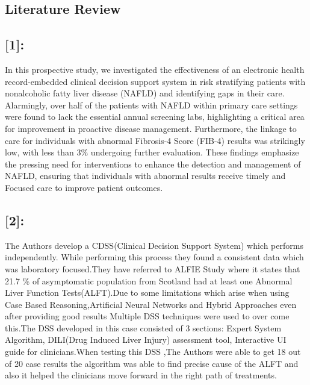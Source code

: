 \documentclass{article}
\begin{document}
\begin{multicols}{2}
\section{Literature Review}
\vspace{5pt}
\subsection{[1]:}
    In this prospective study, we investigated the effectiveness of an electronic health record-embedded clinical decision support system in risk stratifying patients with nonalcoholic fatty liver disease (NAFLD) and identifying gaps in their care. Alarmingly, over half of the patients with NAFLD within primary care settings were found to lack the essential annual screening labs, highlighting a critical area for improvement in proactive disease management. Furthermore, the linkage to care for individuals with abnormal Fibrosis-4 Score (FIB-4) results was strikingly low, with less than 3\% undergoing further evaluation. These findings emphasize the pressing need for interventions to enhance the detection and management of NAFLD, ensuring that individuals with abnormal results receive timely and Focused care to improve patient outcomes.
\vspace{5pt}
\subsection{[2]:}
    The Authors develop a CDSS(Clinical Decision Support System) which performs independently. While performing this process they found a consistent data which was laboratory focused.They have referred to ALFIE Study where it states that 21.7 \% of asymptomatic population from Scotland had at least one Abnormal Liver Function Tests(ALFT).Due to some limitations which arise when using Case Based Reasoning,Artificial Neural Networks and Hybrid Approaches even after providing good results Multiple DSS techniques were used to over come this.The DSS developed in this case consisted of 3 sections: Expert System Algorithm, DILI(Drug Induced Liver Injury) assessment tool, Interactive UI guide for clinicians.When testing this DSS ,The Authors were able to get 18 out of 20 case results the algorithm was able to find precise cause of the ALFT and also it helped the clinicians move forward in the right path of treatments.
\vspace{5pt}

\end{multicols}
\end{document}
